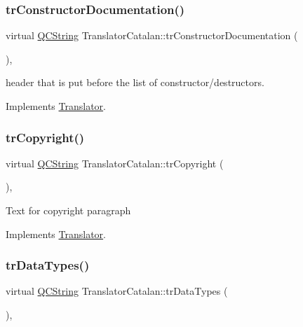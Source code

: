 \subsubsection{\texorpdfstring{trConstructorDocumentation()}{trConstructorDocumentation()}}
{\footnotesize\ttfamily virtual \mbox{\hyperlink{class_q_c_string}{Q\+C\+String}} Translator\+Catalan\+::tr\+Constructor\+Documentation (\begin{DoxyParamCaption}{ }\end{DoxyParamCaption})\hspace{0.3cm}{\ttfamily [inline]}, {\ttfamily [virtual]}}

header that is put before the list of constructor/destructors. 

Implements \mbox{\hyperlink{class_translator}{Translator}}.

\mbox{\label{class_translator_catalan_a792d3d011ea78e8bcf0fd9729ef5ea58}} 
\subsubsection{\texorpdfstring{trCopyright()}{trCopyright()}}
{\footnotesize\ttfamily virtual \mbox{\hyperlink{class_q_c_string}{Q\+C\+String}} Translator\+Catalan\+::tr\+Copyright (\begin{DoxyParamCaption}{ }\end{DoxyParamCaption})\hspace{0.3cm}{\ttfamily [inline]}, {\ttfamily [virtual]}}

Text for copyright paragraph 

Implements \mbox{\hyperlink{class_translator}{Translator}}.

\mbox{\label{class_translator_catalan_abacf0f23e9fb3e453d612ee1c52a1fba}} 
\subsubsection{\texorpdfstring{trDataTypes()}{trDataTypes()}}
{\footnotesize\ttfamily virtual \mbox{\hyperlink{class_q_c_string}{Q\+C\+String}} Translator\+Catalan\+::tr\+Data\+Types (\begin{DoxyParamCaption}{ }\end{DoxyParamCaption})\hspace{0.3cm}{\ttfamily [inline]}, {\ttfamily [virtual]}}

